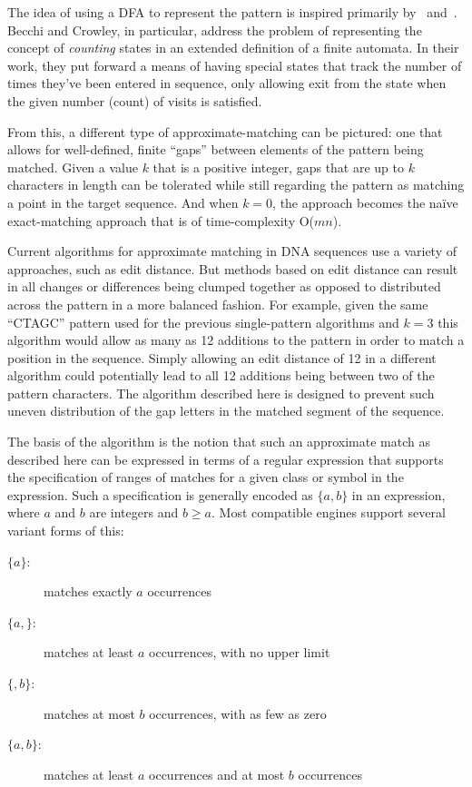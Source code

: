 The idea of using a DFA to represent the pattern is inspired primarily by~\cite{aho.corasick.1975} and~\cite{becchi.crowley.2008}. Becchi and Crowley, in particular, address the problem of representing the concept of \textit{counting} states in an extended definition of a finite automata. In their work, they put forward a means of having special states that track the number of times they've been entered in sequence, only allowing exit from the state when the given number (count) of visits is satisfied.

From this, a different type of approximate-matching can be pictured: one that allows for well-defined, finite ``gaps'' between elements of the pattern being matched. Given a value $k$ that is a positive integer, gaps that are up to $k$ characters in length can be tolerated while still regarding the pattern as matching a point in the target sequence. And when $k = 0$, the approach becomes the na\"{i}ve exact-matching approach that is of time-complexity O($mn$).

Current algorithms for approximate matching in DNA sequences use a variety of approaches, such as edit distance. But methods based on edit distance can result in all changes or differences being clumped together as opposed to distributed across the pattern in a more balanced fashion. For example, given the same ``CTAGC'' pattern used for the previous single-pattern algorithms and $k = 3$ this algorithm would allow as many as 12 additions to the pattern in order to match a position in the sequence. Simply allowing an edit distance of 12 in a different algorithm could potentially lead to all 12 additions being between two of the pattern characters. The algorithm described here is designed to prevent such uneven distribution of the gap letters in the matched segment of the sequence.

The basis of the algorithm is the notion that such an approximate match as described here can be expressed in terms of a regular expression that supports the specification of ranges of matches for a given class or symbol in the expression. Such a specification is generally encoded as \texttt{$\lbrace a,b \rbrace$} in an expression, where $a$ and $b$ are integers and $b \geq a$. Most compatible engines support several variant forms of this:

\begin{description}
\item[\texttt{$\lbrace a \rbrace$}:] matches exactly $a$ occurrences
\item[\texttt{$\lbrace a, \rbrace$}:] matches at least $a$ occurrences, with no upper limit
\item[\texttt{$\lbrace ,b \rbrace$}:] matches at most $b$ occurrences, with as few as zero
\item[\texttt{$\lbrace a,b \rbrace$}:] matches at least $a$ occurrences and at most $b$ occurrences
\end{description}

